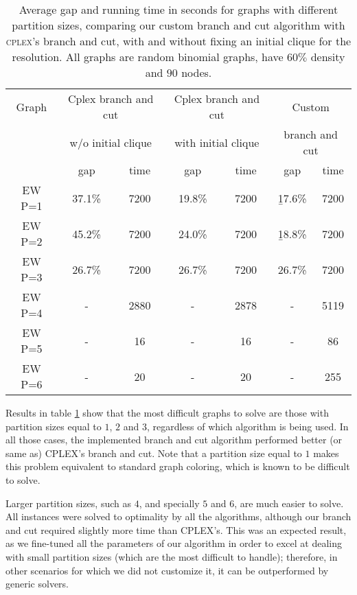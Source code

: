 \begin{table}[h]
\centering
\begin{tabular}{|c|cc|cc|cc|}
\hline
\multicolumn{1}{|c|}{Graph} & \multicolumn{2}{|c|}{Cplex branch and cut} & \multicolumn{2}{|c|}{Cplex branch and cut} & \multicolumn{2}{|c|}{Custom \PCP{}}
\\
\multicolumn{1}{|c|}{} & \multicolumn{2}{|c|}{w/o initial clique} & \multicolumn{2}{|c|}{with initial clique} & \multicolumn{2}{|c|}{branch and cut}
\\
\hline
& gap & time & gap & time & gap & time
\\
\hline
EW P=1 & 37.1\% & 7200 & 19.8\% & 7200 & \b{17.6\%} & 7200
\\
EW P=2 & 45.2\% & 7200 & 24.0\% & 7200 & \b{18.8\%} & 7200
\\
EW P=3 & 26.7\% & 7200 & 26.7\% & 7200 & 26.7\% & 7200
\\
EW P=4 & - & 2880 & - & 2878 & - & 5119
\\
EW P=5 & - & 16 & - & 16 & - & 86
\\
EW P=6 & - & 20 & - & 20 & - & 255
\\
\hline 
\end{tabular} 
\caption{Average gap and running time in seconds for graphs with different partition sizes, comparing our custom \PCP{} branch and cut algorithm with \textsc{cplex}'s branch and cut, with and without fixing an initial clique for the resolution. All graphs are random binomial graphs, have $60\%$ density and $90$ nodes.}
\label{table:final:partitionsizes}
\end{table}
 
Results in table \ref{table:final:partitionsizes} show that the most difficult graphs to solve are those with partition sizes equal to $1$, $2$ and $3$, regardless of which algorithm is being used. In all those cases, the implemented branch and cut algorithm performed better (or same as) \textsc{CPLEX}'s branch and cut. Note that a partition size equal to $1$ makes this problem equivalent to standard graph coloring, which is known to be difficult to solve.

Larger partition sizes, such as $4$, and specially $5$ and $6$, are much easier to solve. All instances were solved to optimality by all the algorithms, although our branch and cut required slightly more time than \textsc{CPLEX}'s. This was an expected result, as we fine-tuned all the parameters of our algorithm in order to excel at dealing with small partition sizes (which are the most difficult to handle); therefore, in other scenarios for which we did not customize it, it can be outperformed by generic solvers.

